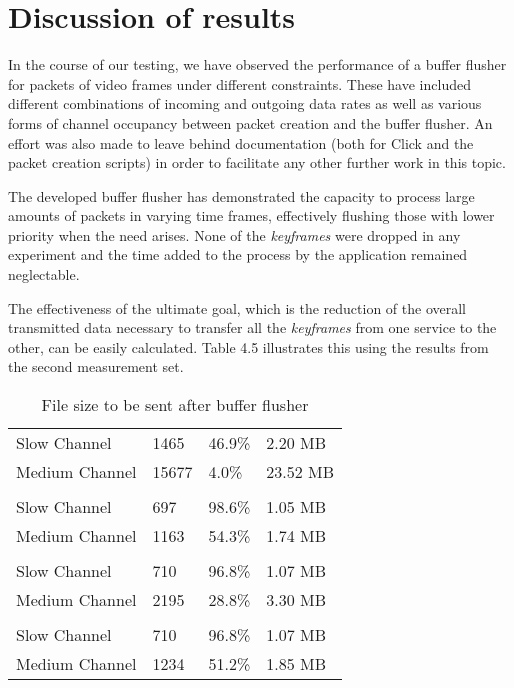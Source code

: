 \clearpage

\section{Discussion of results}

In the course of our testing, we have observed the performance of a buffer flusher for packets of video frames under different constraints. These have included different combinations of incoming and outgoing data rates as well as various forms of channel occupancy between packet creation and the buffer flusher. An effort was also made to leave behind documentation (both for Click and the packet creation scripts) in order to facilitate any other further work in this topic.

The developed buffer flusher has demonstrated the capacity to process large amounts of packets in varying time frames, effectively flushing those with lower priority when the need arises. None of the \textit{keyframes} were dropped in any experiment and the time added to the process by the application remained neglectable. 

The effectiveness of the ultimate goal, which is the reduction of the overall transmitted data necessary to transfer all the \textit{keyframes} from one service to the other, can be easily calculated. Table 4.5 illustrates this using the results from the second measurement set.

\begin{table}[htbp]
\caption{File size to be sent after buffer flusher}
\break
\setlength{\arrayrulewidth}{1mm}
\setlength{\tabcolsep}{12pt}
\renewcommand{\arraystretch}{1.5}
 {
\begin{tabular}{ |p{3cm}|p{3cm}|p{3cm}|p{3cm}| }
\hline
\rowcolor{white}\multicolumn{4}{|c|}{Video traces before flushing} \\
\hline
Slow Channel&1465&46.9\%&2.20 MB\\
Medium Channel&15677&4.0\%&23.52 MB\\
\hline
\rowcolor{white}\multicolumn{4}{|c|}{No cross-traffic} \\
\hline
Slow Channel&697&98.6\%&1.05 MB\\
Medium Channel&1163&54.3\%&1.74 MB\\
\hline
\rowcolor{white}\multicolumn{4}{|c|}{Random cross-traffic} \\
\hline
Slow Channel&710&96.8\%&1.07 MB\\
Medium Channel&2195&28.8\%&3.30 MB\\
\hline
\rowcolor{white}\multicolumn{4}{|c|}{Sample cross-traffic} \\
\hline
Slow Channel&710&96.8\%&1.07 MB\\
Medium Channel&1234&51.2\%&1.85 MB\\
\hline
\end{tabular}
}
\end{table}

